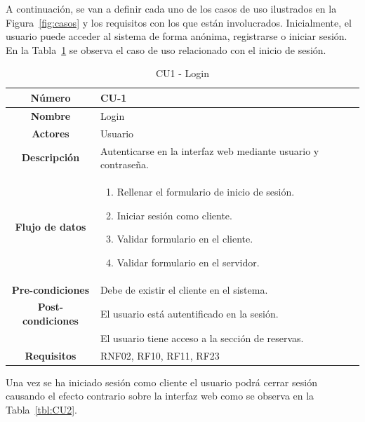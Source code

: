 A continuación, se van a definir cada uno de los casos de uso ilustrados en la Figura~\ref{fig:casos} y los requisitos con los que están involucrados.
Inicialmente, el usuario puede acceder al sistema de forma anónima, registrarse o iniciar sesión. 
En la Tabla~\ref{tbl:CU1} se observa el caso de uso relacionado con el inicio de sesión.
\begin{table}[h!tb]
	\centering
	\begin{adjustbox}{width=1\textwidth}
	\begin{tabular}{|c|p{\textwidth}|}
		\hline {\bf Número} & CU-1 \\
		\hline {\bf Nombre} & Login\\
		\hline {\bf Actores} & Usuario \\
		\hline {\bf Descripción} & Autenticarse en la interfaz web mediante usuario y contraseña. \\
		\hline {\bf Flujo de datos}
		& 
		\begin{enumerate}
            \item Rellenar el formulario de inicio de sesión.
			\item Iniciar sesión como cliente.
			\item Validar formulario en el cliente.
			\item Validar formulario en el servidor.
		\end{enumerate}\\
		\hline {\bf Pre-condiciones}
		& Debe de existir el cliente en el sistema. \\
		\hline {\bf Post-condiciones}
		& El usuario está autentificado en la sesión.\\
        & El usuario tiene acceso a la sección de reservas. \\
		\hline {\bf Requisitos} & RNF02, RF10, RF11, RF23 \\
		\hline 
	\end{tabular}
	\end{adjustbox}
	\caption{CU1 - Login\label{tbl:CU1}}
\end{table}
Una vez se ha iniciado sesión como cliente el usuario podrá cerrar sesión causando el efecto contrario sobre la interfaz web como se observa en la Tabla~\ref{tbl:CU2}.

